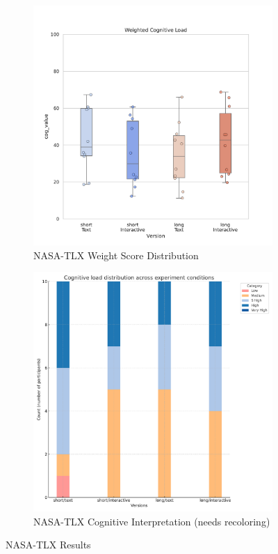 \begin{figure}[ht]
    \centering
    \begin{subfigure}[b]{0.45\textwidth}
        \centering
        \includegraphics[width=\textwidth]{content/image/results/nasatlx_final_value.pdf}
        \caption{NASA-TLX Weight Score Distribution}
        \label{fig:nasatlx-final1}
    \end{subfigure}
    \hfill
    \begin{subfigure}[b]{0.45\textwidth}
        \centering
        \includegraphics[width=\textwidth]{content/image/results/Cognitive_load_distribution.pdf}
        \caption{NASA-TLX Cognitive Interpretation (needs recoloring)}
        \label{fig:nasatlx-final2}
    \end{subfigure}
    \caption{NASA-TLX Results}
    \label{fig:nasatlx-final}
\end{figure}


